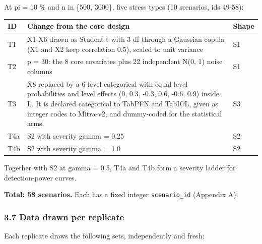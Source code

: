 \documentclass[
  10pt,
]{article}
\newcounter{none} %
\begin{document}
At pi = 10 \% and n in \{500, 3000\}, five stress types (10
scenarios, ids 49-58):

{\def\LTcaptype{none} %
\begin{longtable}[]{@{}
  >{\raggedright\arraybackslash}p{}
  >{\raggedright\arraybackslash}p{}
  >{\raggedright\arraybackslash}p{}@{}}
\toprule\noalign{}
\begin{minipage}[b]{\linewidth}\raggedright
ID
\end{minipage} & \begin{minipage}[b]{\linewidth}\raggedright
Change from the core design
\end{minipage} & \begin{minipage}[b]{\linewidth}\raggedright
Shape
\end{minipage} \\
\midrule\noalign{}
\endhead
\bottomrule\noalign{}
\endlastfoot
T1 & X1-X6 drawn as Student t with 3 df through a Gaussian
copula (X1 and X2 keep correlation 0.5), scaled to unit
variance & S1 \\
T2 & p = 30: the 8 core covariates plus 22 independent N(0,
1) noise columns & S1 \\
T3 & X8 replaced by a 6-level categorical with equal level
probabilities and level effects (0, 0.3, -0.3, 0.6, -0.6,
0.9) inside L. It is declared categorical to TabPFN and
TabICL, given as integer codes to Mitra-v2, and dummy-coded
for the statistical arms. & S3 \\
T4a & S2 with severity gamma = 0.25 & S2 \\
T4b & S2 with severity gamma = 1.0 & S2 \\
\end{longtable}
}

Together with S2 at gamma = 0.5, T4a and T4b form a severity
ladder for detection-power curves.

\textbf{Total: 58 scenarios.} Each has a fixed integer
\texttt{scenario\_id} (Appendix A).

\subsubsection{3.7 Data drawn per
replicate}\label{data-drawn-per-replicate}

Each replicate draws the following sets, independently and
fresh:
\end{document}
